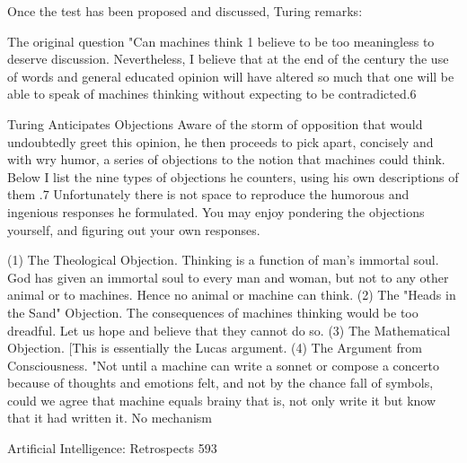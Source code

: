 {Once the test has been proposed and discussed, Turing remarks:

   The original question "Can machines think 1 believe to be too meaningless to
   deserve discussion. Nevertheless, I believe that at the end of the century the use of
   words and general educated opinion will have altered so much that one will be able
   to speak of machines thinking without expecting to be contradicted.6

                           Turing Anticipates Objections
Aware of the storm of opposition that would undoubtedly greet this opinion, he then
proceeds to pick apart, concisely and with wry humor, a series of objections to the notion
that machines could think. Below I list the nine types of objections he counters, using his
own descriptions of them .7 Unfortunately there is not space to reproduce the humorous
and ingenious responses he formulated. You may enjoy pondering the objections
yourself, and figuring out your own responses.

   (1) The Theological Objection. Thinking is a function of man's immortal soul. God
     has given an immortal soul to every man and woman, but not to any other animal
     or to machines. Hence no animal or machine can think.
   (2) The "Heads in the Sand" Objection. The consequences of machines thinking
     would be too dreadful. Let us hope and believe that they cannot do so.
   (3) The Mathematical Objection. [This is essentially the Lucas argument.
   (4) The Argument from Consciousness. "Not until a machine can write a sonnet or
     compose a concerto because of thoughts and emotions felt, and not by the chance
     fall of symbols, could we agree that machine equals brainy that is, not only write
     it but know that it had written it. No mechanism


Artificial Intelligence: Retrospects                                                     593

}
